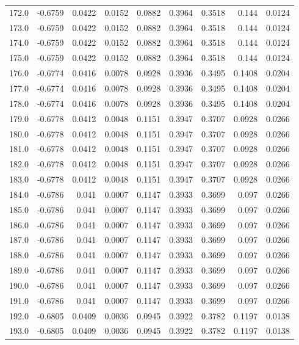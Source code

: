 \begin{longtable}{lrrrrrrrr}
172.0 & -0.6759 & 0.0422 & 0.0152 & 0.0882 & 0.3964 & 0.3518 & 0.144 & 0.0124 \\
173.0 & -0.6759 & 0.0422 & 0.0152 & 0.0882 & 0.3964 & 0.3518 & 0.144 & 0.0124 \\
174.0 & -0.6759 & 0.0422 & 0.0152 & 0.0882 & 0.3964 & 0.3518 & 0.144 & 0.0124 \\
175.0 & -0.6759 & 0.0422 & 0.0152 & 0.0882 & 0.3964 & 0.3518 & 0.144 & 0.0124 \\
176.0 & -0.6774 & 0.0416 & 0.0078 & 0.0928 & 0.3936 & 0.3495 & 0.1408 & 0.0204 \\
177.0 & -0.6774 & 0.0416 & 0.0078 & 0.0928 & 0.3936 & 0.3495 & 0.1408 & 0.0204 \\
178.0 & -0.6774 & 0.0416 & 0.0078 & 0.0928 & 0.3936 & 0.3495 & 0.1408 & 0.0204 \\
179.0 & -0.6778 & 0.0412 & 0.0048 & 0.1151 & 0.3947 & 0.3707 & 0.0928 & 0.0266 \\
180.0 & -0.6778 & 0.0412 & 0.0048 & 0.1151 & 0.3947 & 0.3707 & 0.0928 & 0.0266 \\
181.0 & -0.6778 & 0.0412 & 0.0048 & 0.1151 & 0.3947 & 0.3707 & 0.0928 & 0.0266 \\
182.0 & -0.6778 & 0.0412 & 0.0048 & 0.1151 & 0.3947 & 0.3707 & 0.0928 & 0.0266 \\
183.0 & -0.6778 & 0.0412 & 0.0048 & 0.1151 & 0.3947 & 0.3707 & 0.0928 & 0.0266 \\
184.0 & -0.6786 & 0.041 & 0.0007 & 0.1147 & 0.3933 & 0.3699 & 0.097 & 0.0266 \\
185.0 & -0.6786 & 0.041 & 0.0007 & 0.1147 & 0.3933 & 0.3699 & 0.097 & 0.0266 \\
186.0 & -0.6786 & 0.041 & 0.0007 & 0.1147 & 0.3933 & 0.3699 & 0.097 & 0.0266 \\
187.0 & -0.6786 & 0.041 & 0.0007 & 0.1147 & 0.3933 & 0.3699 & 0.097 & 0.0266 \\
188.0 & -0.6786 & 0.041 & 0.0007 & 0.1147 & 0.3933 & 0.3699 & 0.097 & 0.0266 \\
189.0 & -0.6786 & 0.041 & 0.0007 & 0.1147 & 0.3933 & 0.3699 & 0.097 & 0.0266 \\
190.0 & -0.6786 & 0.041 & 0.0007 & 0.1147 & 0.3933 & 0.3699 & 0.097 & 0.0266 \\
191.0 & -0.6786 & 0.041 & 0.0007 & 0.1147 & 0.3933 & 0.3699 & 0.097 & 0.0266 \\
192.0 & -0.6805 & 0.0409 & 0.0036 & 0.0945 & 0.3922 & 0.3782 & 0.1197 & 0.0138 \\
193.0 & -0.6805 & 0.0409 & 0.0036 & 0.0945 & 0.3922 & 0.3782 & 0.1197 & 0.0138 \\

\end{longtable}
